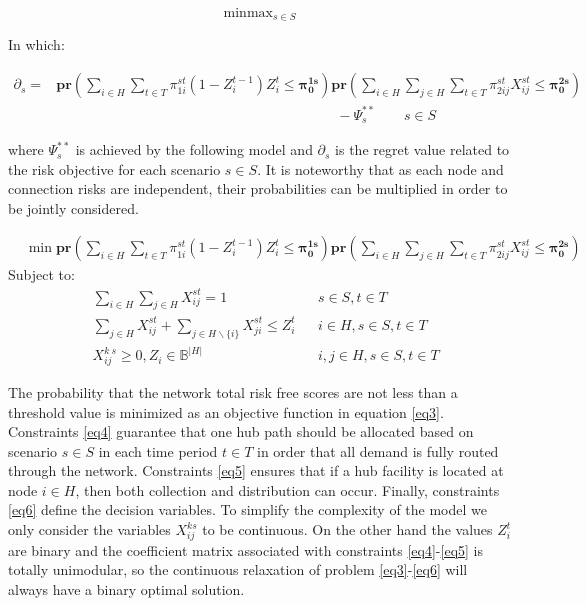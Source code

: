 \documentclass[review]{elsarticle}
\begin{document}
\begin{equation}\label{eq1}
\mathop{\min\max\partial_s}_{s\in S} 
\end{equation}

In which:

\begin{align}\label{eq2}
\partial_s=&\mathbf{pr}\left(\sum_{i\in H}\sum_{t\in T}\pi^{st}_{1i}(1-Z^{t-1}_i)Z^t_i\leq \mathbf{\pi^{1s}_0}\right)\mathbf{ pr}\left(\sum_{i\in H}\sum_{j\in H}\sum_{t\in T}\pi^{st}_{2ij}X^{st}_{ij}\leq \mathbf{\pi^{2s}_0}\right)\nonumber\\
&\qquad\qquad\qquad\qquad\qquad\qquad\qquad\qquad\qquad\qquad -\Psi^{**}_s\qquad s\in S
\end{align} 


where $\Psi^{**}_s$ is achieved by the following model and $\partial_s$ is the regret value related to the risk objective for each scenario $s\in S$. It is noteworthy that as each node and connection risks are independent, their probabilities can be multiplied in order to be jointly considered.  

\begin{align}
&\min \mathbf{ pr}\left(\sum_{i\in H}\sum_{t\in T}\pi^{st}_{1i}(1-Z^{t-1}_i)Z^t_i\leq \mathbf{ \pi^{1s}_{0}}\right)\mathbf{ pr}\left(\sum_{i\in H}\sum_{j\in H}\sum_{t\in T}\pi^{st}_{2ij}X^{st}_{ij}\leq \mathbf{ \pi ^{2s}_{0}}\right)\label{eq3}
\end{align}
Subject to:
\begin{align}
&\sum_{i\in H}{\sum_{j\in H}{X^{st}_{ij}}}=1&&s\in S, t\in T\label{eq4} \\
&\sum_{j\in H}X^{st}_{ij}+\sum_{j\in H\backslash\{i\}}X^{st}_{ji}\leq Z^t_i&&i\in H, s\in S, t\in T\label{eq5}\\
&X^{k\ s}_{ij}\geq 0, Z_i\in {\mathbb{ B}}^{|H|}&&i,j\in H,s\in S,t\in T\label{eq6}
\end{align} 

The probability that the network total risk free scores are not less than a threshold value is minimized as an objective function in equation \eqref{eq3}. Constraints \eqref{eq4} guarantee that one hub path should be allocated based on scenario $s\in S$ in each time period $t\in T$ in order that all demand is fully routed through the network. Constraints \eqref{eq5} ensures that if a hub facility is located at node $i\in H$, then both collection and distribution can occur. Finally, constraints \eqref{eq6} define the decision variables. To simplify the complexity of the model we only consider the variables $X^{ks}_{ij}$ to be continuous. On the other hand the values $Z^t_i$ are binary and the coefficient matrix associated with constraints \eqref{eq4}-\eqref{eq5} is totally unimodular, so the continuous relaxation of problem \eqref{eq3}-\eqref{eq6} will always have a binary optimal solution.
\end{document}
